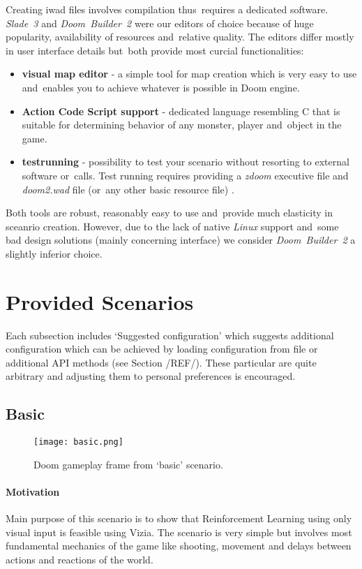 	Creating iwad files involves compilation thus~requires a dedicated software. \emph{Slade~3} and \emph{Doom~Builder~2}  were our editors of choice because of huge popularity, availability of resources and~relative quality. The editors differ mostly in user interface details but~both provide most curcial functionalities:

	\begin{itemize}
		\item \textbf{visual map editor} - a simple tool for map creation which is very easy to use and~enables you to achieve whatever is possible in Doom engine.
		\item \textbf{Action Code Script support} - dedicated language resembling C that is suitable for determining behavior of any monster, player and~object in the game.
		\item \textbf{testrunning} - possibility to test your scenario without resorting to external software or~calls. Test running requires providing a \emph{zdoom} executive file and \emph{doom2.wad} file (or~any other basic resource file) . 
	\end{itemize}

	Both tools are robust, reasonably easy to use and~provide much elasticity in sceanrio creation. However, due to the lack of native \emph{Linux} support and~some bad design solutions (mainly concerning interface) we consider \emph{Doom~Builder~2} a slightly inferior choice. 

	\newpage
\section{Provided Scenarios}\label{sec:scenarios}
	Each subsection includes `Suggested configuration' which suggests additional configuration which can be achieved by loading	configuration from file or additional API methods (see Section /REF/). These particular are quite arbitrary and adjusting them to personal preferences is encouraged.

	\subsection{Basic}\label{subsec:basic}
		
		\begin{figure}
			\centering
			\texttt{[image: basic.png]}
			\caption{Doom gameplay frame from `basic' scenario.}\label{fig:basic}
		\end{figure}

		\paragraph{Motivation}
			Main purpose of this scenario is to show that Reinforcement Learning using only visual input is feasible using Vizia. The scenario is very simple but involves most fundamental mechanics of the game like shooting, movement and delays between actions and reactions of the world.
		
